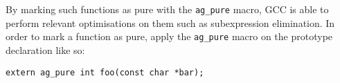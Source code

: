 By marking such functions as pure with the \texttt{ag\_pure} macro, GCC is able
to perform relevant optimisations on them such as subexpression elimination. In
order to mark a function as pure, apply the \texttt{ag\_pure} macro on the
prototype declaration like so:

\begin{lstlisting}[linewidth=1.0\linewidth]
extern ag_pure int foo(const char *bar);
\end{lstlisting}

